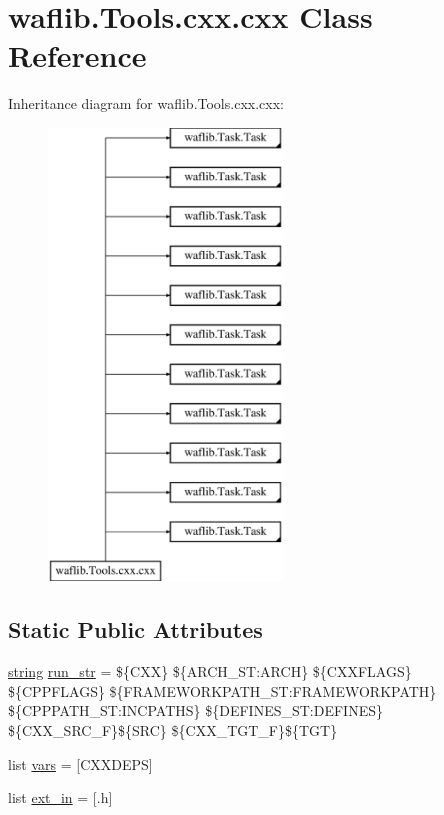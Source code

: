 \hypertarget{classwaflib_1_1_tools_1_1cxx_1_1cxx}{}\section{waflib.\+Tools.\+cxx.\+cxx Class Reference}
\label{classwaflib_1_1_tools_1_1cxx_1_1cxx}
Inheritance diagram for waflib.\+Tools.\+cxx.\+cxx\+:\begin{figure}[H]
\begin{center}
\leavevmode
\includegraphics[height=12.000000cm]{classwaflib_1_1_tools_1_1cxx_1_1cxx}
\end{center}
\end{figure}
\subsection*{Static Public Attributes}
\begin{DoxyCompactItemize}
\item 
\hyperlink{test__lib_f_l_a_c_2format_8c_ab02026ad0de9fb6c1b4233deb0a00c75}{string} \hyperlink{classwaflib_1_1_tools_1_1cxx_1_1cxx_abecd57d6ff8c3cea4898c4b3ee85efd5}{run\+\_\+str} = \textquotesingle{}\$\{C\+XX\} \$\{A\+R\+C\+H\+\_\+\+S\+T\+:\+A\+R\+CH\} \$\{C\+X\+X\+F\+L\+A\+GS\} \$\{C\+P\+P\+F\+L\+A\+GS\} \$\{F\+R\+A\+M\+E\+W\+O\+R\+K\+P\+A\+T\+H\+\_\+\+S\+T\+:\+F\+R\+A\+M\+E\+W\+O\+R\+K\+P\+A\+TH\} \$\{C\+P\+P\+P\+A\+T\+H\+\_\+\+S\+T\+:\+I\+N\+C\+P\+A\+T\+HS\} \$\{D\+E\+F\+I\+N\+E\+S\+\_\+\+S\+T\+:\+D\+E\+F\+I\+N\+ES\} \$\{C\+X\+X\+\_\+\+S\+R\+C\+\_\+F\}\$\{S\+RC\} \$\{C\+X\+X\+\_\+\+T\+G\+T\+\_\+F\}\$\{T\+GT\}\textquotesingle{}
\item 
list \hyperlink{classwaflib_1_1_tools_1_1cxx_1_1cxx_a99795cdc815a15885c0f0acd0977901f}{vars} = \mbox{[}\textquotesingle{}C\+X\+X\+D\+E\+PS\textquotesingle{}\mbox{]}
\item 
list \hyperlink{classwaflib_1_1_tools_1_1cxx_1_1cxx_ad0fcfcb8360726f879a7d50375cbffaa}{ext\+\_\+in} = \mbox{[}\textquotesingle{}.h\textquotesingle{}\mbox{]}
\end{DoxyCompactItemize}
